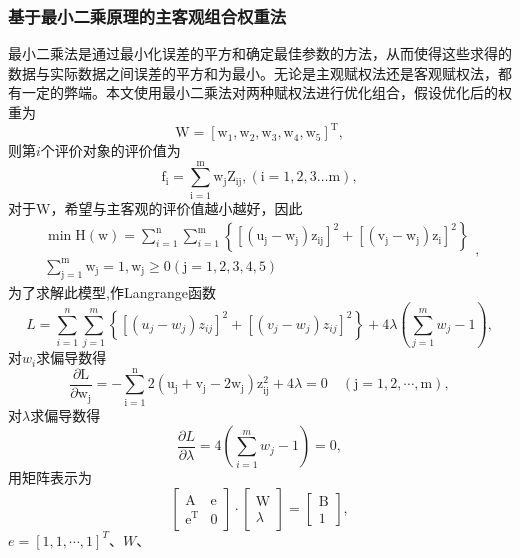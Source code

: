 \documentclass[withoutpreface,bwprint]{cumcmthesis} %
\begin{document}
\subsubsection{基于最小二乘原理的主客观组合权重法}
最小二乘法是通过最小化误差的平方和确定最佳参数的方法，从而使得这些求得的数据与实际数据之间误差的平方和为最小。无论是主观赋权法还是客观赋权法，都有一定的弊端。本文使用最小二乘法对两种赋权法进行优化组合，假设优化后的权重为$$\mathrm{W}=\left[\mathrm{w}_{1}, \mathrm{w}_{2}, \mathrm{w}_{3},\mathrm{w}_{4},\mathrm{w}_{\mathrm{5}}\right]^{\mathrm{T}},$$则第$i$个评价对象的评价值为
$$\mathrm{f}_{\mathrm{i}}=\sum_{\mathrm{i}=1}^{\mathrm{m}} \mathrm{w}_{\mathrm{j}} \mathrm{Z}_{\mathrm{ij}},(\mathrm{i}=1,2, 3 \dots \mathrm{m}),$$
对于W，希望与主客观的评价值越小越好，因此
$$\begin{array}{c}
	\min \mathrm{H}(\mathrm{w})=\sum_{i=1}^{\mathrm{n}} \sum_{i=1}^{\mathrm{m}}\left\{\left[\left(\mathrm{u}_{\mathrm{j}}-\mathrm{w}_{\mathrm{j}}\right) \mathrm{z}_{\mathrm{ij}}\right]^{2}+\left[\left(\mathrm{v}_{\mathrm{j}}-\mathrm{w}_{\mathrm{j}}\right) \mathrm{z}_{\mathrm{i}}\right]^{2}\right\} \\
	\sum_{\mathrm{j}=1}^{\mathrm{m}} \mathrm{w}_{\mathrm{j}}=1, \mathrm{w}_{\mathrm{j}} \geqslant 0(\mathrm{j}=1,2,3,4,5)
\end{array},$$
为了求解此模型,作Langrange函数
$$L=\sum_{i=1}^{n} \sum_{j=1}^{m}\left\{\left[\left(u_{j}-w_{j}\right) z_{i j}\right]^{2}+\left[\left(v_{j}-w_{j}\right) z_{i j}\right]^{2}\right\}+4 \lambda\left(\sum_{j=1}^{m} w_{j}-1\right),$$对$w_i$求偏导数得
$$\frac{\partial \mathrm{L}}{\partial \mathrm{w}_{\mathrm{j}}}=-\sum_{\mathrm{i}=1}^{\mathrm{n}} 2\left(\mathrm{u}_{\mathrm{j}}+\mathrm{v}_{\mathrm{j}}-2 \mathrm{w}_{\mathrm{j}}\right) \mathrm{z}_{\mathrm{ij}}^{2}+4 \lambda=0 \quad(\mathrm{j}=1,2, \cdots, \mathrm{m}),$$
对$\lambda$求偏导数得
$$\frac{\partial L}{\partial \lambda}=4\left(\sum_{i=1}^{m} w_{j}-1\right)=0,$$
用矩阵表示为 $$ \left[\begin{array}{cc}\mathrm{A} & \mathrm{e} \\ \mathrm{e}^{\mathrm{T}} & 0\end{array}\right] \cdot\left[\begin{array}{c}\mathrm{W} \\ \lambda\end{array}\right]=\left[\begin{array}{l}\mathrm{B} \\ 1\end{array}\right] ,$$
 $e=[1,1, \cdots, 1]^{T} $、$ W $、
\end{document}
